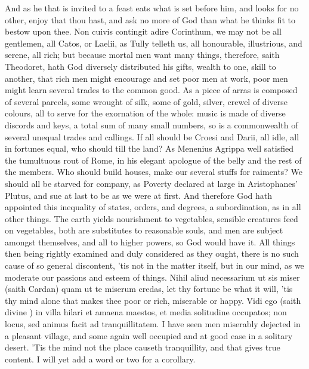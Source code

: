 {And as he that is invited to a feast eats what is set before him,
and looks for no other, enjoy that thou hast, and ask no more of God
than what he thinks fit to bestow upon thee. Non cuivis contingit adire
Corinthum, we may not be all gentlemen, all Catos, or Laelii, as Tully
telleth us, all honourable, illustrious, and serene, all rich; but
because mortal men want many things, therefore, saith Theodoret,
hath God diversely distributed his gifts, wealth to one, skill to
another, that rich men might encourage and set poor men at work, poor
men might learn several trades to the common good. As a piece of arras
is composed of several parcels, some wrought of silk, some of gold,
silver, crewel of diverse colours, all to serve for the exornation of
the whole: music is made of diverse discords and keys, a total sum of
many small numbers, so is a commonwealth of several unequal trades and
callings. If all should be Croesi and Darii, all idle, all in
fortunes equal, who should till the land? As Menenius Agrippa
well satisfied the tumultuous rout of Rome, in his elegant apologue of
the belly and the rest of the members. Who should build houses, make
our several stuffs for raiments? We should all be starved for company,
as Poverty declared at large in Aristophanes' Plutus, and sue at last
to be as we were at first. And therefore God hath appointed this
inequality of states, orders, and degrees, a subordination, as in all
other things. The earth yields nourishment to vegetables, sensible
creatures feed on vegetables, both are substitutes to reasonable souls,
and men are subject amongst themselves, and all to higher powers, so
God would have it. All things then being rightly examined and duly
considered as they ought, there is no such cause of so general
discontent, 'tis not in the matter itself, but in our mind, as we
moderate our passions and esteem of things. Nihil aliud necessarium ut
sis miser (saith Cardan) quam ut te miserum credas, let thy
fortune be what it will, 'tis thy mind alone that makes thee poor or
rich, miserable or happy. Vidi ego (saith divine \Seneca) in villa
hilari et amaena maestos, et media solitudine occupatos; non locus, sed
animus facit ad tranquillitatem. I have seen men miserably dejected in
a pleasant village, and some again well occupied and at good ease in a
solitary desert. 'Tis the mind not the place causeth tranquillity, and
that gives true content. I will yet add a word or two for a corollary.

}
